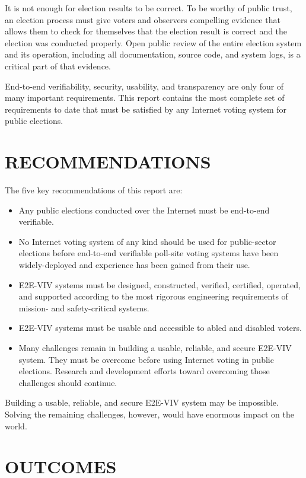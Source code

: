 It is not enough for election results to be correct. To be worthy of
public trust, an election process must give voters and observers
compelling evidence that allows them to check for themselves that the
election result is correct and the election was conducted
properly. Open public review of the entire election system and its
operation, including all documentation, source code, and system logs,
is a critical part of that evidence.

\vspace{1cm}

End-to-end verifiability, security, usability, and transparency are
only four of many important requirements. This report contains the
most complete set of requirements to date that must be satisfied by
any Internet voting system for public elections.

\newpage

\section*{RECOMMENDATIONS}

The five key recommendations of this report are:
\begin{itemize}
\item Any public elections conducted over the Internet must be
  end-to-end verifiable.
\item No Internet voting system of any kind should be used for
  public-sector elections before end-to-end verifiable poll-site
  voting systems have been widely-deployed and experience has been
  gained from their use.
\item E2E-VIV systems must be designed, constructed, verified,
  certified, operated, and supported according to the most rigorous
  engineering requirements of mission- and safety-critical systems.
\item E2E-VIV systems must be usable and accessible to abled
  and disabled voters.
\item Many challenges remain in building a usable, reliable, and
  secure E2E-VIV system. They must be overcome before using Internet
  voting in public elections. Research and development efforts toward
  overcoming those challenges should continue.
\end{itemize}

Building a usable, reliable, and secure E2E-VIV system may be
impossible. Solving the remaining challenges, however, would have
enormous impact on the world.

\section*{OUTCOMES}

